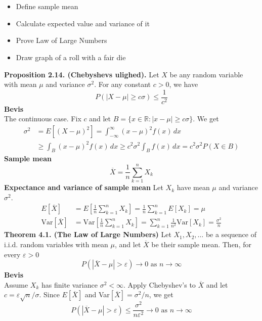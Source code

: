\documentclass[12pt,a4paper]{report}
\author{Frederik Appel Vardinghus-Nielsen}
\begin{document}
\\\\
\begin{itemize}
\setlength\itemsep{0em}
\item Define sample mean
\item Calculate expected value and variance of it
\item Prove Law of Large Numbers
\item Draw graph of a roll with a fair die
\end{itemize}
\textbf{Proposition 2.14. (Chebyshevs ulighed).} Let $X$ be any random variable with mean $\mu$ and variance $\sigma^2$. For any constant $c>0$, we have
\begin{equation}
P(|X-\mu|\geq c\sigma)\leq\frac{1}{c^2}
\end{equation}
\textbf{Bevis}\\
The continuous case. Fix $c$ and let $B=\{x\in\mathbb{R}:|x-\mu|\geq c\sigma\}$. We get
\begin{align*}
\sigma^2&=E[(X-\mu)^2]=\int_{-\infty}^{\infty}\!(x-\mu)^2f(x)\,dx\\
&\geq\int_B\!(x-\mu)^2f(x)\,dx\geq c^2\sigma^2\int_B\!f(x)\,dx=c^2\sigma^2P(X\in B)
\end{align*}
\textbf{Sample mean}
\begin{equation}
\overline{X}=\frac{1}{n}\sum_{k=1}^nX_k
\end{equation}
\textbf{Expectance and variance of sample mean} Let $X_k$ have mean $\mu$ and variance $\sigma^2$.
\begin{align*}
E[\overline{X}]&=E\left[\frac{1}{n}\sum_{k=1}^nX_k\right]=\frac{1}{n}\sum_{k=1}^nE[X_k]=\mu\\
\text{Var}[\overline{X}]&=\text{Var}\left[\frac{1}{n}\sum_{k=1}^nX_k\right]=\sum_{k=1}^n\frac{1}{n^2}\text{Var}[X_k]=\frac{\sigma^2}{n}
\end{align*}
\textbf{Theorem 4.1. (The Law of Large Numbers)} Let $X_1,X_2,\ldots$ be a sequence of i.i.d. random variables with mean $\mu$, and let $\overline{X}$ be their sample mean. Then, for every $\varepsilon>0$
\begin{equation}
P(|\overline{X}-\mu|>\varepsilon)\to0\text{ as }n\to\infty
\end{equation}
\textbf{Bevis}\\
Assume $X_k$ has finite variance $\sigma^2<\infty$. Apply Chebyshev's to $\overline{X}$ and let $c=\varepsilon\sqrt{n}/\sigma$. Since $E[\overline{X}]$ and Var$[\overline{X}]=\sigma^2/n$, we get
\begin{equation}
P(|\overline{X}-\mu|>\varepsilon)\leq\frac{\sigma^2}{n\varepsilon^2}\to0\text{ as }n\to\infty
\end{equation}
\end{document}
